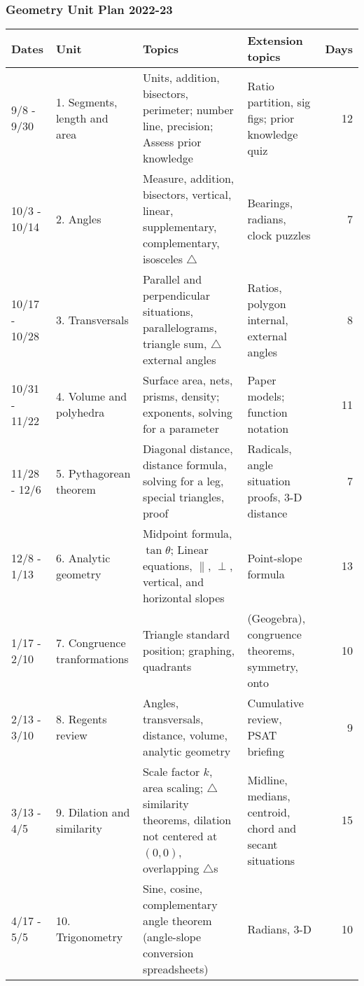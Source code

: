 \documentclass[12pt, twoside]{article}
\begin{document}
\subsubsection*{Geometry Unit Plan 2022-23}

\begin{tabular}{|p{2.9cm}|p{4.7cm}|p{8cm}|p{5cm}|r|}
  \hline
  Dates & Unit & Topics  & Extension topics & Days \\
  \hline
  9/8 - 9/30 & 1. Segments, length and area & Units, addition, bisectors, perimeter; number line, precision; Assess prior knowledge & Ratio partition, sig figs; prior knowledge quiz & 12 \\
  \hline
  10/3 - 10/14 & 2. Angles & Measure, addition, bisectors, vertical, linear, supplementary, complementary, isosceles $\triangle$ & Bearings, radians, clock puzzles & 7 \\
  \hline
  10/17 - 10/28 & 3. Transversals & Parallel and perpendicular situations, parallelograms, triangle sum, $\triangle$ external angles & Ratios, polygon internal, external angles & 8 \\
  \hline
  10/31 - 11/22 & 4. Volume and polyhedra & Surface area, nets, prisms, density; exponents, solving for a parameter & Paper models; function notation & 11 \\
  \hline
  11/28 - 12/6 & 5. Pythagorean theorem & Diagonal distance, distance formula, solving for a leg, special triangles, proof & Radicals, angle situation proofs, 3-D distance & 7 \\
  \hline
  12/8 - 1/13 & 6. Analytic geometry & Midpoint formula, $\tan \theta$; Linear equations, $\parallel$, $\perp$, vertical, and horizontal slopes & Point-slope formula & 13 \\
  \hline
  1/17 - 2/10  & 7. Congruence tranformations & Triangle standard position; graphing, quadrants & (Geogebra), congruence theorems, symmetry, onto & 10 \\
  \hline
  2/13 - 3/10 & 8. Regents review & Angles, transversals, distance, volume, analytic geometry & Cumulative review, PSAT briefing & 9 \\
  \hline
  3/13 - 4/5 & 9. Dilation and similarity & Scale factor $k$, area scaling; $\triangle$ similarity theorems, dilation not centered at $(0,0)$, overlapping $\triangle$s & Midline, medians, centroid, chord and secant situations & 15 \\
  \hline
  4/17 - 5/5 & 10. Trigonometry & Sine, cosine, complementary angle theorem (angle-slope conversion spreadsheets) & Radians, 3-D & 10 \\

\end{tabular}
\end{document}
